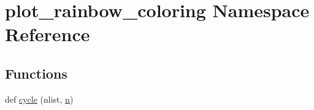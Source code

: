 \hypertarget{namespaceplot__rainbow__coloring}{}\section{plot\+\_\+rainbow\+\_\+coloring Namespace Reference}
\label{namespaceplot__rainbow__coloring}
\subsection*{Functions}
\begin{DoxyCompactItemize}
\item 
def \hyperlink{namespaceplot__rainbow__coloring_af1d4a9b6e692c5c7c243e7abece6a75f}{cycle} (nlist, \hyperlink{namespaceplot__rainbow__coloring_af616ef90805ed9418fa18a27c32f8be6}{n})
\end{DoxyCompactItemize}
